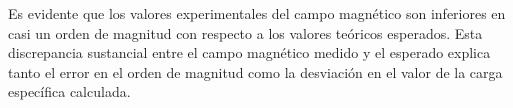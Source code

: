 Es evidente que los valores experimentales del campo magnético son inferiores en
casi un orden de magnitud con respecto a los valores teóricos esperados.
Esta discrepancia sustancial entre el campo magnético medido y el esperado
explica tanto el error en el orden de magnitud como la desviación en el valor de
la carga específica calculada.
